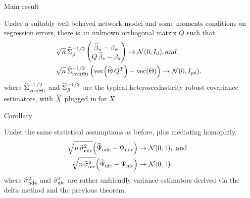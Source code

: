 \documentclass[aspectratio=169]{beamer}
\theoremstyle{remark}
\begin{document}
\begin{frame}{Main result}

    \begin{theorem}

        \vspace{2mm}

        Under a suitably well-behaved network model and some moments conditions on regression errors, there is an unknown orthogonal matrix $Q$ such that
        \begin{equation*}
            \begin{aligned}
                \sqrt{ n } \,
                 & \Sigmahatbeta^{-1/2}
                \begin{pmatrix}
                    \betawhat - \betaw \\
                    Q \, \betaxhat - \betax
                \end{pmatrix}
                \to
                \Normal{0}{I_d}, and     \\
                \sqrt{ n } \,
                 & \Sigmahattheta^{-1/2}
                \begin{pmatrix}
                    \vecc \paren*{\Thetahat \, Q^T} - \Thetavec
                \end{pmatrix}
                \to
                \Normal{0}{I_{p d}}.
            \end{aligned}
        \end{equation*}
        \noindent where $\widehat{\Sigma}_{\operatorname*{vec} \left(\Theta\right)}^{-1/2}$ and $\widehat{\Sigma}_\beta^{-1/2}$ are the typical heteroscedasticity robust covariance estimators, with $\widehat{X}$ plugged in for $X$.
    \end{theorem}
\end{frame}

\begin{frame}{Corollary}

    \begin{theorem}

        \vspace{2mm}

        Under the same statistical assumptions as before, plus mediating homophily,
        \begin{align*}
            \sqrt{n \, \sigmahatnde} \paren*{\ndehat - \nde}
             & \to
            \Normal{0}{1}, \text { and } \\
            \sqrt{n \, \sigmahatnie} \paren*{\niehat - \nie}
             & \to
            \Normal{0}{1}.
        \end{align*}
        \noindent where $\widehat{\sigma}^2_\mathrm{nde}$ and $\widehat{\sigma}^2_\mathrm{nie}$ are rather unfriendly variance estimators derived via the delta method and the previous theorem.

    \end{theorem}

\end{frame}
\end{document}
